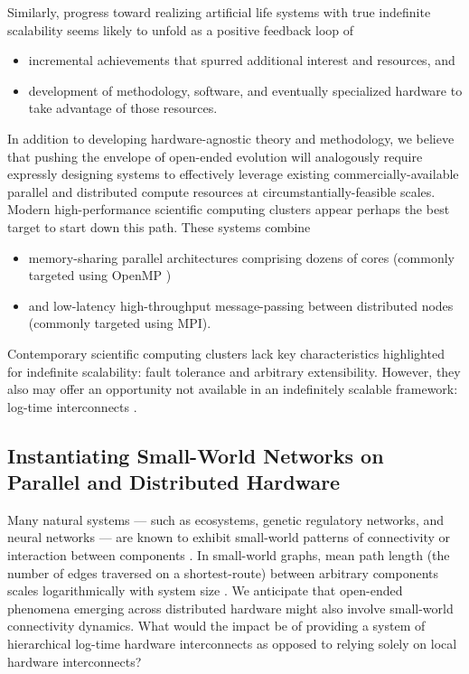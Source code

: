 Similarly, progress toward realizing artificial life systems with true indefinite scalability seems likely to unfold as a positive feedback loop of
\begin{itemize}
\item incremental achievements that spurred additional interest and resources, and
\item development of methodology, software, and eventually specialized hardware to take advantage of those resources.
\end{itemize}
In addition to developing hardware-agnostic theory and methodology, we believe that pushing the envelope of open-ended evolution will analogously require expressly designing systems to effectively leverage existing commercially-available parallel and distributed compute resources at circumstantially-feasible scales.
Modern high-performance scientific computing clusters appear perhaps the best target to start down this path.
These systems combine
\begin{itemize}
\item memory-sharing parallel architectures comprising dozens of cores (commonly targeted using OpenMP \citep{dagum1998openmp})
\item and low-latency high-throughput message-passing between distributed nodes (commonly targeted using MPI\citep{clarke1994mpi}).
\end{itemize}

Contemporary scientific computing clusters lack key characteristics highlighted for indefinite scalability: fault tolerance and arbitrary extensibility.
However, they also may offer an opportunity not available in an indefinitely scalable framework: log-time interconnects \citep{mollah2018comparative}.

\subsection{Instantiating Small-World Networks on Parallel and Distributed Hardware}

Many natural systems --- such as ecosystems, genetic regulatory networks, and neural networks --- are known to exhibit small-world patterns of connectivity or interaction between components \citep{bassett2017small, fox2014herbivores, gaiteri2014beyond}.
In small-world graphs, mean path length (the number of edges traversed on a shortest-route) between arbitrary components scales logarithmically with system size \citep{watts1998collective}.
We anticipate that open-ended phenomena emerging across distributed hardware might also involve small-world connectivity dynamics.
What would the impact be of providing a system of hierarchical log-time hardware interconnects as opposed to relying solely on local hardware interconnects?

